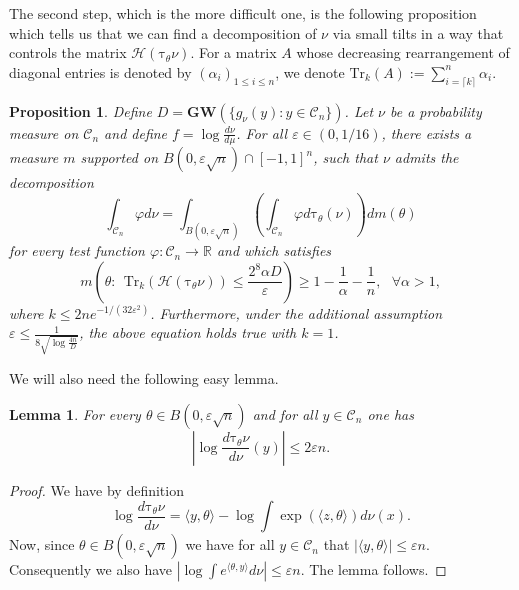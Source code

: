 \documentclass[12pt]{article}
\def \tilt{ \mathrm{\tau} }
\def \RR {\mathbb R}
\def \eps {\varepsilon}
\def \tr {\mathrm{Tr}}
\def \DC {\mathcal{C}_n}
\def \MW {\mathbf{GW}}
\def \HH {\mathcal{H}}
\newtheorem{lemma}[theorem]{Lemma}
\newtheorem{proposition}[theorem]{Proposition}
\theoremstyle{definition}
\theoremstyle{remark}
\begin{document}
The second step, which is the more difficult one, is the following proposition which tells us that we can find a decomposition of $\nu$ via small tilts in a way that controls the matrix $\HH(\tilt_\theta \nu)$. For a matrix $A$ whose decreasing rearrangement of diagonal entries is denoted by $(\alpha_i)_{1 \leq i \leq n}$, we denote $\tr_k(A) := \sum_{i= \lceil k \rceil }^n \alpha_i$.
\begin{proposition} \label{prop:step2}
Define $D = \MW \left ( \{ g_\nu(y): y \in \DC \} \right ) $. Let $\nu$ be a probability measure on $\DC$ and define $f = \log \frac{d \nu}{d \mu}$. For all $\eps \in \left (0,  1/16 \right )$, there exists a measure $m$ supported on $B(0, \eps \sqrt{n}) \cap [-1,1]^n$, such that $\nu$ admits the decomposition
\begin{equation}\label{eq:decompprop}
\int_{\DC} \varphi d\nu = \int_{B(0, \eps \sqrt{n})} \left (\int_{\DC} \varphi d \tilt_\theta (\nu) \right ) d m(\theta)
\end{equation}
for every test function $\varphi: \DC \to \RR$ and which satisfies
\begin{equation}\label{eq:Hnusmall}
m \left (\theta: ~~ \tr_{k}(\HH(\tilt_\theta \nu)) \leq  \frac{2^8 \alpha D}{\eps} \right ) \geq 1 - \frac{1}{\alpha} - \frac{1}{n}, ~~~ \forall \alpha > 1,
\end{equation}
where $k \leq 2n e^{-1/(32 \eps^2)}$. 
Furthermore, under the additional assumption $\eps \leq \frac{1}{8 \sqrt{\log \frac{4n}{D} }}$, the above equation holds true with $k=1$.
\end{proposition}

We will also need the following easy lemma.
\begin{lemma} \label{lem:easy}
For every $\theta \in B(0, \eps \sqrt{n})$ and for all $y \in \DC$ one has
\begin{equation}\label{eq:lemeasy}
\left | \log \frac{d \tilt_\theta \nu}{d \nu}(y) \right | \leq 2 \eps n.
\end{equation}
\end{lemma}
\begin{proof}
We have by definition
$$
\log \frac{d \tilt_\theta \nu}{d \nu} = \langle y, \theta \rangle - \log \int \exp(\langle z, \theta \rangle ) d \nu(x).
$$		
Now, since $\theta \in B(0, \eps \sqrt{n})$ we have for all $y \in \DC$ that $|\langle y, \theta \rangle| \leq \eps n$. Consequently we also have $\left |\log \int e^{\langle \theta, y \rangle} d \nu \right | \leq \eps n$. The lemma follows.
\end{proof}
\end{document}
